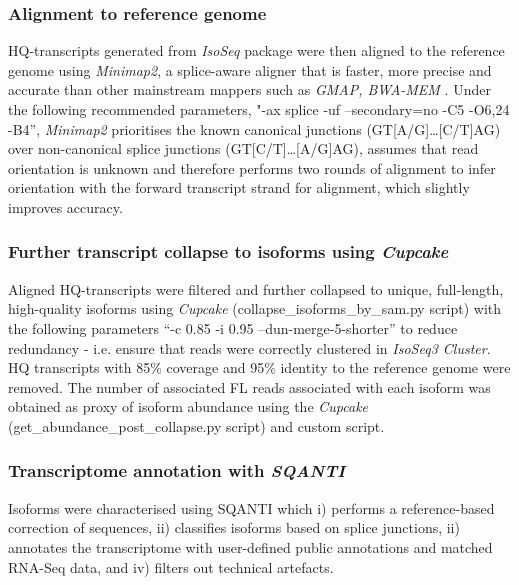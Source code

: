 \newpage
\subsubsection{Alignment to reference genome} 
HQ-transcripts generated from \textit{IsoSeq} package were then aligned to the reference genome using \textit{Minimap2}, a splice-aware aligner that is faster, more precise and accurate than other mainstream mappers such as \textit{GMAP, BWA-MEM} \cite{SimirKriZanoviC2018,Tang2020}. Under the following recommended parameters, "-ax splice -uf --secondary=no -C5 -O6,24 -B4”,  \textit{Minimap2} prioritises the known canonical junctions (GT[A/G]…[C/T]AG) over non-canonical splice junctions (GT[C/T]…[A/G]AG), assumes that read orientation is unknown and therefore performs two rounds of alignment to infer orientation with the forward transcript strand for alignment, which slightly improves accuracy. 

\subsubsection{Further transcript collapse to isoforms using \textit{Cupcake}}
Aligned HQ-transcripts were filtered and further collapsed to unique, full-length, high-quality isoforms using \textit{Cupcake} (collapse\_isoforms\_by\_sam.py script) with the following parameters  “-c 0.85 -i 0.95 --dun-merge-5-shorter” to reduce redundancy - i.e. ensure that reads were correctly clustered in \textit{IsoSeq3 Cluster}. HQ transcripts with 85\% coverage and 95\% identity to the reference genome were removed. The number of associated FL reads associated with each isoform was obtained as proxy of isoform abundance using the \textit{Cupcake} (get\_abundance\_post\_collapse.py script) and custom script. 

\subsubsection{Transcriptome annotation with \textit{SQANTI}}
\label{section: sqanti_annotations}
Isoforms were characterised using SQANTI\cite{Tardaguila2018} which i) performs a reference-based correction of sequences, ii) classifies isoforms based on splice junctions, ii) annotates the transcriptome with user-defined public annotations and matched RNA-Seq data, and iv) filters out technical artefacts. 

